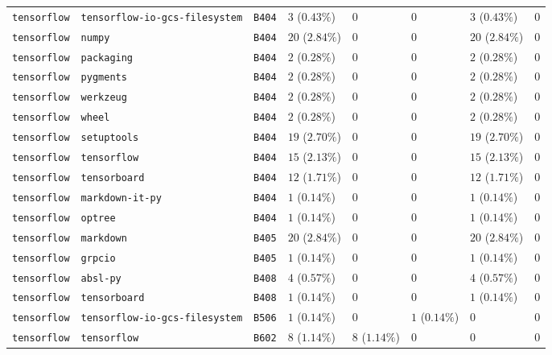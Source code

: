 \begin{table}
\begin{tabular}{llllllll}
\texttt{tensorflow} & \texttt{tensorflow-io-gcs-filesystem} & \texttt{B404} & $3$ ($0.43\%$) & $0$ & $0$ & $3$ ($0.43\%$) & $0$ \\
\texttt{tensorflow} & \texttt{numpy} & \texttt{B404} & $20$ ($2.84\%$) & $0$ & $0$ & $20$ ($2.84\%$) & $0$ \\
\texttt{tensorflow} & \texttt{packaging} & \texttt{B404} & $2$ ($0.28\%$) & $0$ & $0$ & $2$ ($0.28\%$) & $0$ \\
\texttt{tensorflow} & \texttt{pygments} & \texttt{B404} & $2$ ($0.28\%$) & $0$ & $0$ & $2$ ($0.28\%$) & $0$ \\
\texttt{tensorflow} & \texttt{werkzeug} & \texttt{B404} & $2$ ($0.28\%$) & $0$ & $0$ & $2$ ($0.28\%$) & $0$ \\
\texttt{tensorflow} & \texttt{wheel} & \texttt{B404} & $2$ ($0.28\%$) & $0$ & $0$ & $2$ ($0.28\%$) & $0$ \\
\texttt{tensorflow} & \texttt{setuptools} & \texttt{B404} & $19$ ($2.70\%$) & $0$ & $0$ & $19$ ($2.70\%$) & $0$ \\
\texttt{tensorflow} & \texttt{tensorflow} & \texttt{B404} & $15$ ($2.13\%$) & $0$ & $0$ & $15$ ($2.13\%$) & $0$ \\
\texttt{tensorflow} & \texttt{tensorboard} & \texttt{B404} & $12$ ($1.71\%$) & $0$ & $0$ & $12$ ($1.71\%$) & $0$ \\
\texttt{tensorflow} & \texttt{markdown-it-py} & \texttt{B404} & $1$ ($0.14\%$) & $0$ & $0$ & $1$ ($0.14\%$) & $0$ \\
\texttt{tensorflow} & \texttt{optree} & \texttt{B404} & $1$ ($0.14\%$) & $0$ & $0$ & $1$ ($0.14\%$) & $0$ \\
\texttt{tensorflow} & \texttt{markdown} & \texttt{B405} & $20$ ($2.84\%$) & $0$ & $0$ & $20$ ($2.84\%$) & $0$ \\
\texttt{tensorflow} & \texttt{grpcio} & \texttt{B405} & $1$ ($0.14\%$) & $0$ & $0$ & $1$ ($0.14\%$) & $0$ \\
\texttt{tensorflow} & \texttt{absl-py} & \texttt{B408} & $4$ ($0.57\%$) & $0$ & $0$ & $4$ ($0.57\%$) & $0$ \\
\texttt{tensorflow} & \texttt{tensorboard} & \texttt{B408} & $1$ ($0.14\%$) & $0$ & $0$ & $1$ ($0.14\%$) & $0$ \\
\texttt{tensorflow} & \texttt{tensorflow-io-gcs-filesystem} & \texttt{B506} & $1$ ($0.14\%$) & $0$ & $1$ ($0.14\%$) & $0$ & $0$ \\
\texttt{tensorflow} & \texttt{tensorflow} & \texttt{B602} & $8$ ($1.14\%$) & $8$ ($1.14\%$) & $0$ & $0$ & $0$ \\

\end{tabular}
\end{table}
